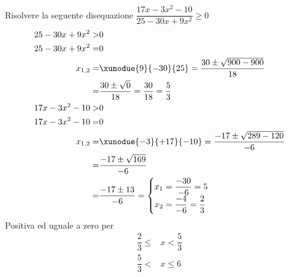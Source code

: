 	Risolvere la seguente disequazione $\dfrac{17x-3x^2-10}{25-30x+9x^2}\geq 0$
	\begin{align*}
25-30x+9x^2>&0\\
25-30x+9x^2=&0\\
x_{1,2}=&\xunodue{9}{-30}{25}=\dfrac{30\pm\sqrt{900-900}}{18}\\
=&\dfrac{30\pm\sqrt{0}}{18}=\dfrac{30}{18}=\dfrac{5}{3}\\
17x-3x^2-10>&0\\
17x-3x^2-10=&0\\
x_{1,2}=&\xunodue{-3}{+17}{-10}=\dfrac{-17\pm\sqrt{289-120}}{-6}\\
=&\dfrac{-17\pm\sqrt{169}}{-6}\\
=&\dfrac{-17\pm 13}{-6}=\begin{cases}
x_1=\dfrac{-30}{-6}=5\\
x_2=\dfrac{-4}{-6}=\dfrac{2}{3}
\end{cases}\\
	\end{align*}
Positiva ed uguale a zero per
	\begin{align*}
	\dfrac{2}{3}\leq&x<\dfrac{5}{3}\\
	\dfrac{5}{3}<&x\leq 6\\
	\end{align*}
\begin{center}
	
\end{center}
